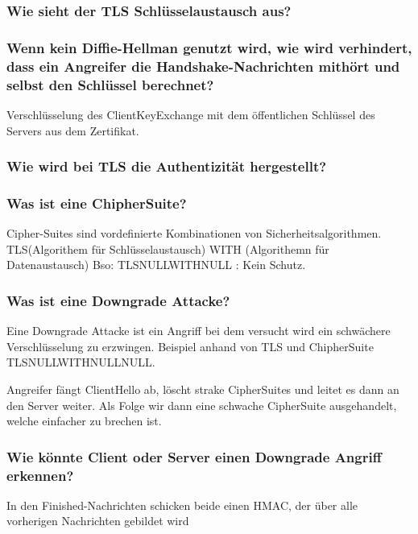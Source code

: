 	\subsubsection{Wie sieht der TLS Schlüsselaustausch aus?}


	
	\subsubsection{Wenn kein Diffie-Hellman genutzt wird, wie wird verhindert, dass ein Angreifer die Handshake-Nachrichten mithört und selbst den Schlüssel berechnet?} 
	Verschlüsselung des ClientKeyExchange mit dem öffentlichen Schlüssel des Servers aus dem Zertifikat.
	
	

	\subsubsection{Wie wird bei TLS die Authentizität hergestellt?}
		
	
	\subsubsection{Was ist eine ChipherSuite?}
	Cipher-Suites sind vordefinierte Kombinationen von Sicherheitsalgorithmen.
	TLS\textunderscore (Algorithem für Schlüsselaustausch) WITH (Algorithemn für Datenaustausch)
	Bso: TLS\textunderscore NULL\textunderscore WITH\textunderscore NULL : Kein Schutz.
	
	\subsubsection{Was ist eine Downgrade Attacke?}
	Eine Downgrade Attacke ist ein Angriff bei dem versucht wird ein schwächere Verschlüsselung zu erzwingen. Beispiel anhand von TLS und ChipherSuite TLS\textunderscore NULL\textunderscore WITH\textunderscore NULL\textunderscore NULL.	
	
	Angreifer fängt ClientHello ab, löscht strake CipherSuites und leitet es dann an den Server weiter. Als Folge wir dann eine schwache CipherSuite ausgehandelt, welche einfacher zu brechen ist.
	\subsubsection{Wie könnte Client oder Server einen Downgrade Angriff erkennen?}
	In den Finished-Nachrichten schicken beide einen HMAC, der über alle vorherigen Nachrichten gebildet wird
	
